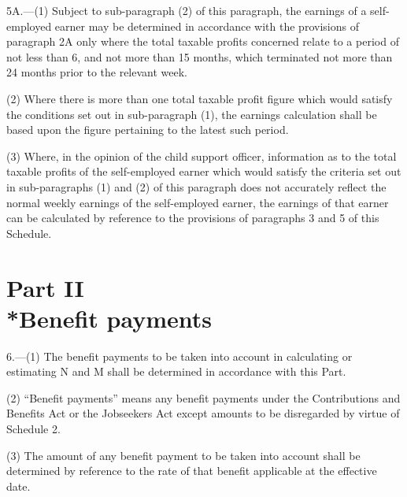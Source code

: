 \documentclass[12pt,a4paper]{article}
\begin{document}
\medskip

5A.—(1) Subject to sub-paragraph (2) of this paragraph, the earnings of a self-employed earner may be determined in accordance with the provisions of paragraph 2A only where the total taxable profits concerned relate to a period of not less than 6, and not more than 15 months, which terminated not more than 24 months prior to the relevant week.

(2) Where there is more than one total taxable profit figure which would satisfy the conditions set out in sub-paragraph (1), the earnings calculation shall be based upon the figure pertaining to the latest such period.

(3) Where, in the opinion of the child support officer, information as to the total taxable profits of the self-employed earner which would satisfy the criteria set out in sub-paragraphs (1) and (2) of this paragraph does not accurately reflect the normal weekly earnings of the self-employed earner, the earnings of that earner can be calculated by reference to the provisions of paragraphs 3 and 5 of this Schedule.


\section[Part II --- Benefit payments]{Part II\\*Benefit payments}

\renewcommand\parthead{--- Schedule 1 Part II}

6.—(1) The benefit payments to be taken into account in calculating or estimating N and M shall be determined in accordance with this Part.

(2) “Benefit payments” means any benefit payments under the Contributions and Benefits Act 
or the Jobseekers Act  %
except amounts to be disregarded by virtue of Schedule 2.

(3) The amount of any benefit payment to be taken into account shall be determined by reference to the rate of that benefit applicable at the effective date.

\end{document}

